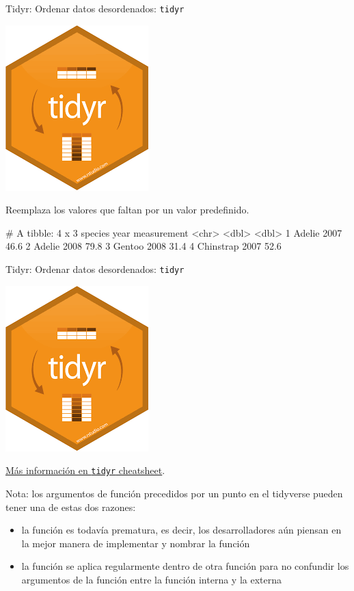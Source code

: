 \documentclass[
  ignorenonframetext,
  aspectratio=169]{beamer}
\newenvironment{Shaded}{\begin{snugshade}}{\end{snugshade}}
\newcommand{\AttributeTok}[1]{\textcolor[rgb]{0.77,0.63,0.00}{#1}}
\newcommand{\FunctionTok}[1]{\textcolor[rgb]{0.00,0.00,0.00}{#1}}
\newcommand{\NormalTok}[1]{#1}
\newcommand{\SpecialCharTok}[1]{\textcolor[rgb]{0.00,0.00,0.00}{#1}}
\let\oldverbatim\verbatim
\let\endoldverbatim\endverbatim
\renewenvironment{verbatim}{\tiny\oldverbatim}{\endoldverbatim}
\begin{document}
\begin{frame}[fragile]{Tidyr: Ordenar datos desordenados:
\texttt{tidyr}}
\protect\hypertarget{tidyr-ordenar-datos-desordenados-tidyr-14}{}
\begin{flushright}\includegraphics[width=0.05\linewidth]{Imgs/logo_tidyr} \end{flushright}

Reemplaza los valores que faltan por un valor predefinido.

\begin{Shaded}
\end{Shaded}

\begin{verbatim}
# A tibble: 4 x 3
  species    year measurement
  <chr>     <dbl>       <dbl>
1 Adelie     2007        46.6
2 Adelie     2008        79.8
3 Gentoo     2008        31.4
4 Chinstrap  2007        52.6
\end{verbatim}
\end{frame}

\begin{frame}[fragile]{Tidyr: Ordenar datos desordenados:
\texttt{tidyr}}
\protect\hypertarget{tidyr-ordenar-datos-desordenados-tidyr-15}{}
\begin{flushright}\includegraphics[width=0.05\linewidth]{Imgs/logo_tidyr} \end{flushright}

\href{https://raw.githubusercontent.com/rstudio/cheatsheets/master/data-import.pdf}{Más
información en \texttt{tidyr} cheatsheet}.

Nota: los argumentos de función precedidos por un punto en el tidyverse
pueden tener una de estas dos razones:

\begin{itemize}
\item
  la función es todavía prematura, es decir, los desarrolladores aún
  piensan en la mejor manera de implementar y nombrar la función
\item
  la función se aplica regularmente dentro de otra función para no
  confundir los argumentos de la función entre la función interna y la
  externa
\end{itemize}
\end{frame}
\end{document}
